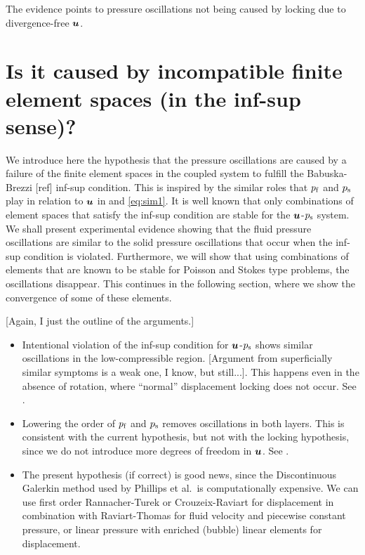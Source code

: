 
The evidence points to pressure oscillations not being caused by locking due to
divergence-free $\boldsymbol{u}$.

\section{Is it caused by incompatible finite element spaces (in the inf-sup sense)?}

We introduce here the hypothesis that the pressure oscillations are caused by a
failure of the finite element spaces in the coupled system to fulfill the
Babuska-Brezzi [ref] inf-sup condition.
This is inspired by the similar roles that $p_{\text{f}}$ and $p_{\text{s}}$ play in relation to $\boldsymbol{u}$
in  and \eqref{eq:sim1}.
It is well known that only combinations of element spaces that satisfy the
inf-sup condition are stable for the $\boldsymbol{u}$-$p_{\text{s}}$ system.
We shall present experimental evidence showing that the fluid pressure
oscillations are similar to the solid pressure oscillations that occur when the
inf-sup condition is violated.
Furthermore, we will show that using combinations of elements that are known to
be stable for Poisson and Stokes type problems, the oscillations disappear.
This continues in the following section, where we show the
convergence of some of these elements.

[Again, I just the outline of the arguments.]

\begin{itemize}
\item Intentional violation of the inf-sup condition for $\boldsymbol{u}$-$p_{\text{s}}$ shows similar oscillations in the
  low-compressible region. [Argument from superficially similar symptoms is a
  weak one, I know, but still...]. This happens even in
  the absence of rotation, where ``normal'' displacement locking does not
  occur. See .
\item Lowering the order of $p_{\text{f}}$ and $p_{\text{s}}$ removes oscillations in both
  layers. This is consistent with the current hypothesis, but not with the locking
  hypothesis, since we do not introduce more degrees of freedom in $\boldsymbol{u}$. See
  .
\item The present hypothesis (if correct) is good news, since the Discontinuous
  Galerkin method used by Phillips et al.~is computationally expensive. We can use first order
  Rannacher-Turek or Crouzeix-Raviart for displacement in combination with
  Raviart-Thomas for fluid velocity and piecewise constant pressure, or linear
  pressure with enriched (bubble) linear elements for displacement.
\end{itemize}

